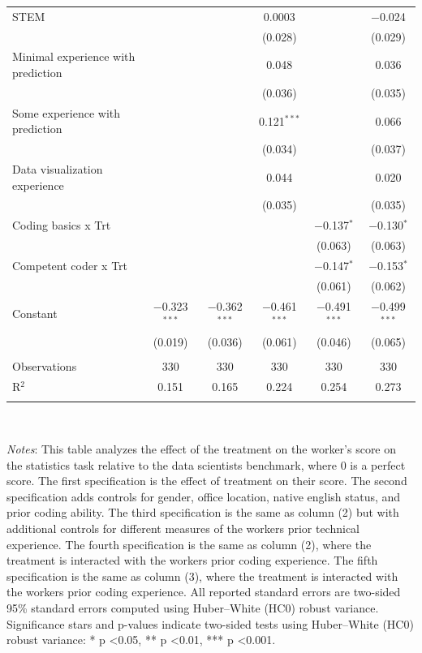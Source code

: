 \begin{table}[!htbp]
\begin{tabular}{@{\extracolsep{-5pt}}lccccc}
  STEM &  &  & 0.0003 &  & $-$0.024 \\ 
  &  &  & (0.028) &  & (0.029) \\ 
  Minimal experience with prediction &  &  & 0.048 &  & 0.036 \\ 
  &  &  & (0.036) &  & (0.035) \\ 
  Some experience with prediction &  &  & 0.121$^{***}$ &  & 0.066 \\ 
  &  &  & (0.034) &  & (0.037) \\ 
  Data visualization experience &  &  & 0.044 &  & 0.020 \\ 
  &  &  & (0.035) &  & (0.035) \\ 
  Coding basics x Trt &  &  &  & $-$0.137$^{*}$ & $-$0.130$^{*}$ \\ 
  &  &  &  & (0.063) & (0.063) \\ 
  Competent coder x Trt &  &  &  & $-$0.147$^{*}$ & $-$0.153$^{*}$ \\ 
  &  &  &  & (0.061) & (0.062) \\ 
  Constant & $-$0.323$^{***}$ & $-$0.362$^{***}$ & $-$0.461$^{***}$ & $-$0.491$^{***}$ & $-$0.499$^{***}$ \\ 
  & (0.019) & (0.036) & (0.061) & (0.046) & (0.065) \\ 
 \hline \\[-1.8ex] 
Observations & 330 & 330 & 330 & 330 & 330 \\ 
R$^{2}$ & 0.151 & 0.165 & 0.224 & 0.254 & 0.273 \\ 
\hline 
\hline \\[-1.8ex] 
\end{tabular}
\\
\begin{minipage}{\textwidth}
{\footnotesize \emph{Notes}: This table analyzes the effect of the treatment on the worker's score on the statistics task relative to the data scientists benchmark, where 0 is a perfect score. The first specification is the effect of treatment on their score. The second specification adds controls for gender, office location, native english status, and prior coding ability. The third specification is the same as column (2) but with additional controls for different measures of the workers prior technical experience. The fourth specification is the same as column (2), where the treatment is interacted with the workers prior coding experience. The fifth specification is the same as column (3), where the treatment is interacted with the workers prior coding experience. All reported standard errors are two-sided 95\% standard errors computed using Huber--White (HC0) robust variance. Significance stars and p-values indicate two-sided tests using Huber--White (HC0) robust variance: * p \textless 0.05, ** p \textless 0.01, *** p \textless 0.001.}
\end{minipage}
\end{table}
